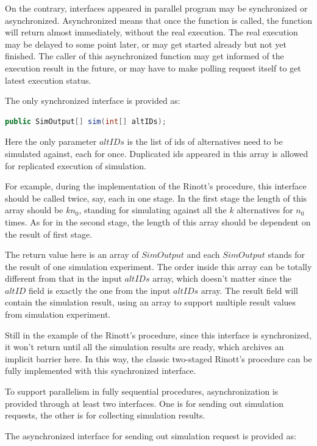 On the contrary, interfaces appeared in parallel program may be synchronized or asynchronized. Asynchronized means that once the function is called, the function will return almost immediately, without the real execution. The real execution may be delayed to some point later, or may get started already but not yet finished. The caller of this asynchronized function may get informed of the execution result in the future, or may have to make polling request itself to get latest execution status.

The only synchronized interface is provided as:

\begin{lstlisting}[language=Java]
public SimOutput[] sim(int[] altIDs);
\end{lstlisting}

Here the only parameter $altIDs$ is the list of ids of alternatives need to be simulated against, each for once. Duplicated ids appeared in this array is allowed for replicated execution of simulation.

For example, during the implementation of the Rinott's procedure, this interface should be called twice, say, each in one stage. In the first stage the length of this array should be $kn_0$, standing for simulating against all the $k$ alternatives for $n_0$ times. As for in the second stage, the length of this array should be dependent on the result of first stage.

The return value here is an array of $SimOutput$ and each $SimOutput$ stands for the result of one simulation experiment. The order inside this array can be totally different from that in the input $altIDs$ array, which doesn't matter since the $altID$ field is exactly the one from the input $altIDs$ array. The result field will contain the simulation result, using an array to support multiple result values from simulation experiment.

Still in the example of the Rinott's procedure, since this interface is synchronized, it won't return until all the simulation results are ready, which archives an implicit barrier here. In this way, the classic two-staged Rinott's procedure can be fully implemented with this synchronized interface.

To support parallelism in fully sequential procedures, asynchronization is provided through at least two interfaces. One is for sending out simulation requests, the other is for collecting simulation results.

The asynchronized interface for sending out simulation request is provided as:

